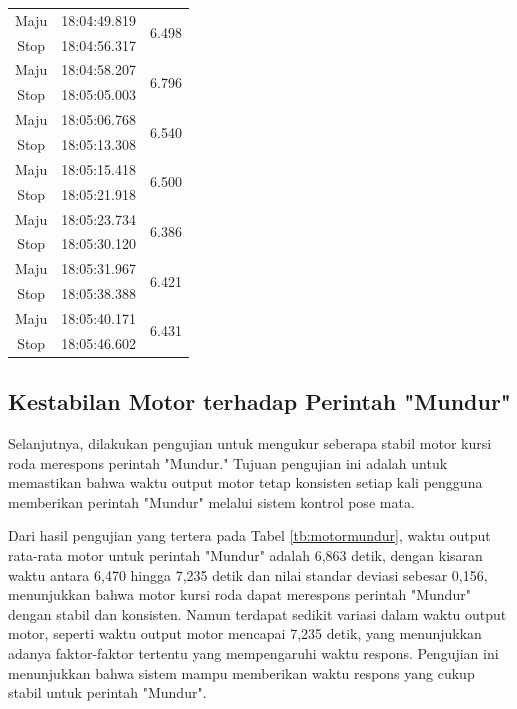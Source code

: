 \begin{longtable}{|c|c|c|}
  Maju           & 18:04:49.819        & \multirow{2}{*}{6.498}  \\ \cline{1-2}
  Stop           & 18:04:56.317        &                         \\ \hline
  Maju           & 18:04:58.207        & \multirow{2}{*}{6.796}  \\ \cline{1-2}
  Stop           & 18:05:05.003        &                         \\ \hline
  Maju           & 18:05:06.768        & \multirow{2}{*}{6.540}  \\ \cline{1-2}
  Stop           & 18:05:13.308        &                         \\ \hline
  Maju           & 18:05:15.418        & \multirow{2}{*}{6.500}  \\ \cline{1-2}
  Stop           & 18:05:21.918        &                         \\ \hline
  Maju           & 18:05:23.734        & \multirow{2}{*}{6.386}  \\ \cline{1-2}
  Stop           & 18:05:30.120        &                         \\ \hline
  Maju           & 18:05:31.967        & \multirow{2}{*}{6.421}  \\ \cline{1-2}
  Stop           & 18:05:38.388        &                         \\ \hline
  Maju           & 18:05:40.171        & \multirow{2}{*}{6.431}  \\ \cline{1-2}
  Stop           & 18:05:46.602        &                         \\ \hline
\end{longtable}

\subsection{Kestabilan Motor terhadap Perintah "Mundur"}

Selanjutnya, dilakukan pengujian untuk mengukur seberapa stabil motor kursi roda merespons perintah "Mundur." Tujuan pengujian ini adalah untuk memastikan bahwa waktu output motor tetap konsisten setiap kali pengguna memberikan perintah "Mundur" melalui sistem kontrol pose mata. 

Dari hasil pengujian yang tertera pada Tabel \ref{tb:motormundur}, waktu output rata-rata motor untuk perintah "Mundur" adalah 6,863 detik, dengan kisaran waktu antara 6,470 hingga 7,235 detik dan nilai standar deviasi sebesar 0,156, menunjukkan bahwa motor kursi roda dapat merespons perintah "Mundur" dengan stabil dan konsisten. Namun terdapat sedikit variasi dalam waktu output motor, seperti waktu output motor mencapai 7,235 detik, yang menunjukkan adanya faktor-faktor tertentu yang mempengaruhi waktu respons. Pengujian ini menunjukkan bahwa sistem mampu memberikan waktu respons yang cukup stabil untuk perintah "Mundur".

